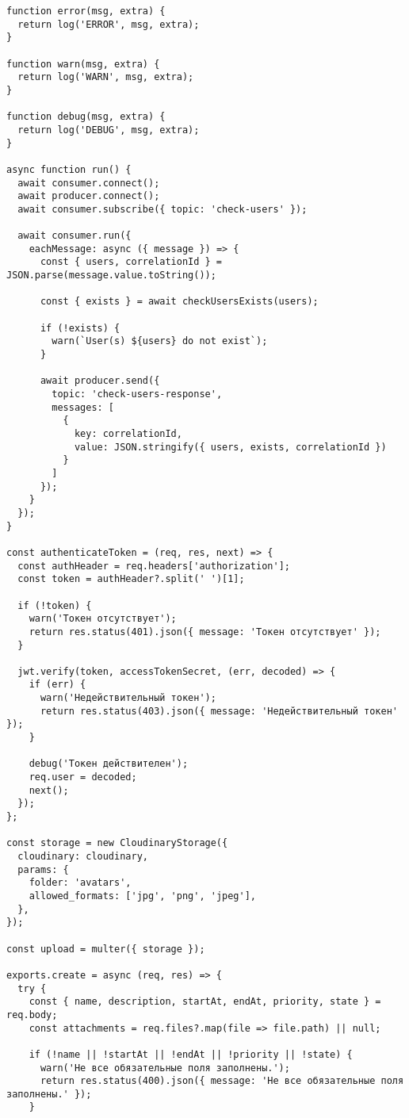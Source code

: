\begin{lstlisting}[style=CodeListing]
function error(msg, extra) {
  return log('ERROR', msg, extra);
}

function warn(msg, extra) {
  return log('WARN', msg, extra);
}

function debug(msg, extra) {
  return log('DEBUG', msg, extra);
}

async function run() {
  await consumer.connect();
  await producer.connect();
  await consumer.subscribe({ topic: 'check-users' });

  await consumer.run({
    eachMessage: async ({ message }) => {
      const { users, correlationId } = JSON.parse(message.value.toString());

      const { exists } = await checkUsersExists(users);

      if (!exists) {
        warn(`User(s) ${users} do not exist`);
      }

      await producer.send({
        topic: 'check-users-response',
        messages: [
          {
            key: correlationId,
            value: JSON.stringify({ users, exists, correlationId })
          }
        ]
      });
    }
  });
}

const authenticateToken = (req, res, next) => {
  const authHeader = req.headers['authorization'];
  const token = authHeader?.split(' ')[1];

  if (!token) {
    warn('Токен отсутствует');
    return res.status(401).json({ message: 'Токен отсутствует' });
  }

  jwt.verify(token, accessTokenSecret, (err, decoded) => {
    if (err) {
      warn('Недействительный токен');
      return res.status(403).json({ message: 'Недействительный токен' });
    }

    debug('Токен действителен');
    req.user = decoded;
    next();
  });
};

const storage = new CloudinaryStorage({
  cloudinary: cloudinary,
  params: {
    folder: 'avatars',
    allowed_formats: ['jpg', 'png', 'jpeg'],
  },
});

const upload = multer({ storage });

exports.create = async (req, res) => {
  try {
    const { name, description, startAt, endAt, priority, state } = req.body;
    const attachments = req.files?.map(file => file.path) || null;

    if (!name || !startAt || !endAt || !priority || !state) {
      warn('Не все обязательные поля заполнены.');
      return res.status(400).json({ message: 'Не все обязательные поля заполнены.' });
    }


\end{lstlisting}
